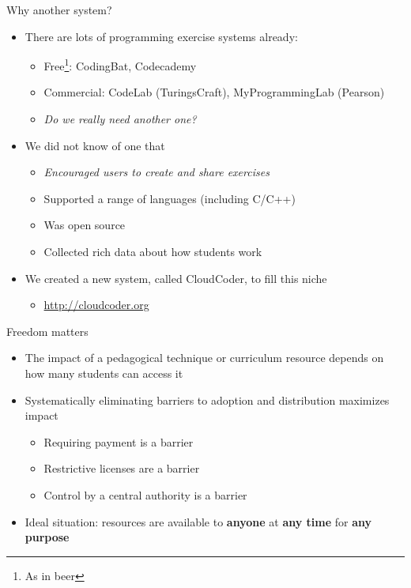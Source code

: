 \documentclass{beamer}
\begin{document}
\begin{frame}{Why another system?}

\begin{itemize}
  \item There are lots of programming exercise systems already:
  \begin{itemize}
    \item Free\footnote{As in beer}: CodingBat, Codecademy
    \item Commercial: CodeLab (TuringsCraft), MyProgrammingLab (Pearson)
    \item {\em Do we really need another one?}
  \end{itemize}
  \item We did not know of one that
  \begin{itemize}
    \item {\em Encouraged users to create and share exercises}
    \item Supported a range of languages (including C/C++)
    \item Was open source
    \item Collected rich data about how students work
  \end{itemize}
  \item We created a new system, called CloudCoder, to fill this niche
    \begin{itemize}
    \item \url{http://cloudcoder.org}
    \end{itemize}
\end{itemize}

\end{frame}

\begin{frame}{Freedom matters}

\begin{itemize}
  \item The impact of a pedagogical technique or curriculum resource
        depends on how many students can access it
  \item Systematically eliminating barriers to adoption and distribution maximizes impact
  \begin{itemize}
    \item Requiring payment is a barrier
    \item Restrictive licenses are a barrier
    \item Control by a central authority is a barrier
  \end{itemize}
  \item Ideal situation: resources are available to {\bf anyone} at {\bf any time} for {\bf any purpose}
\end{itemize}

\end{frame}
\end{document}

